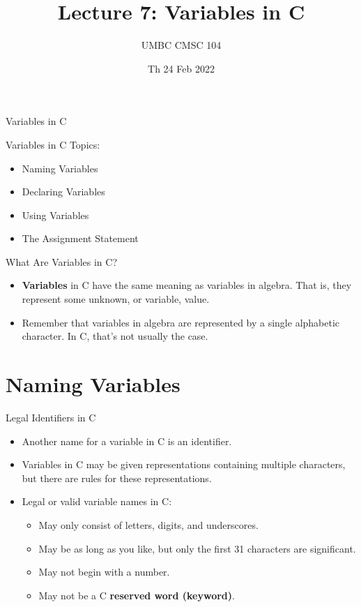 \documentclass[graphics]{beamer}
\title{Lecture 7: Variables in C}
\author{UMBC CMSC 104}
\date{Th 24 Feb 2022}
\begin{document}
\begin{frame}{}
\centering
    Variables in C
\end{frame}



\begin{frame}{Variables in C}
    Topics:
    \begin{itemize}
        \item Naming Variables
        \item Declaring Variables
        \item Using Variables
        \item The Assignment Statement
    \end{itemize}
\end{frame}

\begin{frame}{What Are Variables in C?}
    \begin{itemize}
        \item \textbf{Variables} in C have the same meaning as variables in algebra. That is, they represent some unknown, or variable, value. \\
        \item Remember that variables in algebra are represented by a single alphabetic character. In C, that's not usually the case.
    \end{itemize}
\end{frame}

\section*{Naming Variables}
\begin{frame}{Legal Identifiers in C}
    \begin{itemize}
        \item Another name for a variable in C is an identifier.
        \item Variables in C may be given representations containing multiple characters, but there are rules for these representations.
        \item Legal or valid variable names in C:
        \begin{itemize}
            \item May only consist of letters, digits, and underscores.
            \item May be as long as you like, but only the first 31 characters are significant.
            \item May not begin with a number.
            \item May not be a C \textbf{reserved word (keyword)}.
        \end{itemize}
    \end{itemize}
\end{frame}
\end{document}
